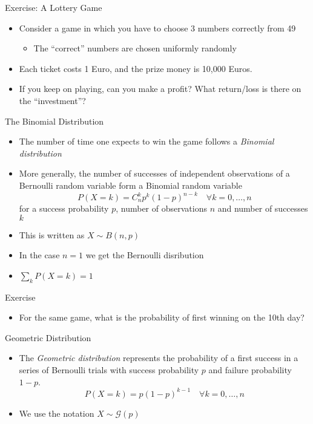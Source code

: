 \documentclass{beamer}
\begin{document}
\begin{frame}{Exercise: A Lottery Game}  
\begin{itemize} 
\item Consider a game in which you have to choose 3 numbers correctly from 49 
\begin{itemize}
\item The ``correct'' numbers are chosen uniformly randomly 
\end{itemize}
\item Each ticket costs 1 Euro, and the prize money is 10,000 Euros. 
\item If you keep on playing, can you make a profit? What return/loss is there on the ``investment''?
\end{itemize}
\end{frame}

\begin{frame}{The Binomial Distribution} 
\begin{itemize} 
 \item The number of time one expects to win the game follows a \emph{Binomial distribution}  
\item More generally, the number of successes of independent observations of a Bernoulli random variable form a Binomial random variable 
\begin{displaymath} 
 P(X = k) = C^k_n p^k (1-p)^{n-k} \quad \forall k = 0, \ldots, n
\end{displaymath}
for a success probability $p$, number of observations $n$ and number of successes $k$ 
\item This is written as $X \sim B(n, p)$ 
\item In the case $n=1$ we get the Bernoulli disribution 
\item $\sum_k P(X = k) = 1$  
\end{itemize}
\end{frame}

\begin{frame}{Exercise} 
\begin{itemize} 
 \item For the same game, what is the probability of first winning on the 10th day? 
\end{itemize}
\end{frame}

\begin{frame}{Geometric Distribution} 
\begin{itemize} 
 \item The \emph{Geometric distribution} represents the probability of a first success in a series of Bernoulli trials with success probability $p$ and failure probability $1-p$.  
 \begin{displaymath} 
 P(X = k) = p (1-p)^{k-1} \quad \forall k = 0, \ldots, n
\end{displaymath}
\item We use the notation $X \sim \mathcal{G}(p)$
\end{itemize}
\end{frame}
\end{document}
